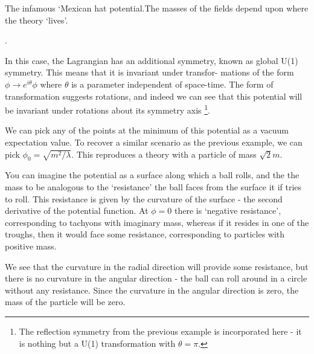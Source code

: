 \begin{marginfigure}
\caption{The infamous `Mexican hat potential.The masses of the fields depend upon where the theory `lives'. }.
\end{marginfigure}

In this case, the Lagrangian has an additional symmetry, known as
global U(1) symmetry. This means that it is invariant under transfor- mations of the form $\phi\rightarrow e^{i\theta}\phi$ where $\theta$ is a parameter independent of space-time. The form of transformation suggests rotations, and indeed we can see that this potential will be invariant under rotations about its symmetry axis \footnote{ The reflection symmetry from the previous example is incorporated here - it is nothing but a U(1) transformation with $\theta = \pi$.}.

We can pick any of the points at the minimum of this potential as a vacuum expectation value. To recover a similar scenario as the previous example, we can pick $\phi_0 = \sqrt{m^2/\lambda}$. This reproduces a theory with a particle of mass $\sqrt{2}m$.

You can imagine the potential as a surface along which a ball rolls, and the the mass to be analogous to the `resistance' the ball faces from the surface it if tries to roll. This resistance is given by the curvature of the surface - the second derivative of the potential function.
At $\phi = 0$ there is `negative resistance', corresponding to tachyons with imaginary mass, whereas if it resides in one of the troughs, then it would face some resistance, corresponding to particles with positive mass.

We see that the curvature in the radial direction will provide some resistance, but there is no curvature in the angular direction - the ball can roll around in a circle without any resistance. Since the curvature in the angular direction is zero, the mass of the particle will be zero.

